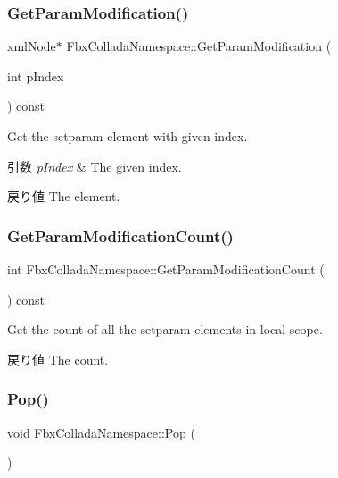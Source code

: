 \subsubsection{\texorpdfstring{Get\+Param\+Modification()}{GetParamModification()}}
{\footnotesize\ttfamily xml\+Node$\ast$ Fbx\+Collada\+Namespace\+::\+Get\+Param\+Modification (\begin{DoxyParamCaption}\item[{int}]{p\+Index }\end{DoxyParamCaption}) const}

Get the setparam element with given index. 
\begin{DoxyParams}{引数}
{\em p\+Index} & The given index. \\
\hline
\end{DoxyParams}
\begin{DoxyReturn}{戻り値}
The element. 
\end{DoxyReturn}
\mbox{\label{struct_fbx_collada_namespace_a0f8447e3228c77bca4f9a1ad2f759e1d}} 
\subsubsection{\texorpdfstring{Get\+Param\+Modification\+Count()}{GetParamModificationCount()}}
{\footnotesize\ttfamily int Fbx\+Collada\+Namespace\+::\+Get\+Param\+Modification\+Count (\begin{DoxyParamCaption}{ }\end{DoxyParamCaption}) const}

Get the count of all the setparam elements in local scope. \begin{DoxyReturn}{戻り値}
The count. 
\end{DoxyReturn}
\mbox{\label{struct_fbx_collada_namespace_ae1748532010af20d42578135ba8fab6e}} 
\subsubsection{\texorpdfstring{Pop()}{Pop()}}
{\footnotesize\ttfamily void Fbx\+Collada\+Namespace\+::\+Pop (\begin{DoxyParamCaption}{ }\end{DoxyParamCaption})}

